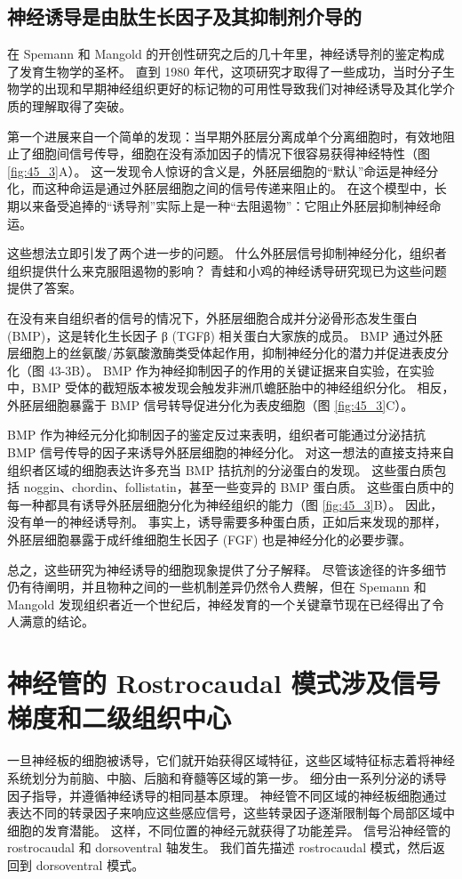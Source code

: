 \subsection{神经诱导是由肽生长因子及其抑制剂介导的}

在 Spemann 和 Mangold 的开创性研究之后的几十年里，神经诱导剂的鉴定构成了发育生物学的圣杯。 直到 1980 年代，这项研究才取得了一些成功，当时分子生物学的出现和早期神经组织更好的标记物的可用性导致我们对神经诱导及其化学介质的理解取得了突破。

第一个进展来自一个简单的发现：当早期外胚层分离成单个分离细胞时，有效地阻止了细胞间信号传导，细胞在没有添加因子的情况下很容易获得神经特性（图 \ref{fig:45_3}A）。 这一发现令人惊讶的含义是，外胚层细胞的“默认”命运是神经分化，而这种命运是通过外胚层细胞之间的信号传递来阻止的。 在这个模型中，长期以来备受追捧的“诱导剂”实际上是一种“去阻遏物”：它阻止外胚层抑制神经命运。

这些想法立即引发了两个进一步的问题。 什么外胚层信号抑制神经分化，组织者组织提供什么来克服阻遏物的影响？ 青蛙和小鸡的神经诱导研究现已为这些问题提供了答案。

在没有来自组织者的信号的情况下，外胚层细胞合成并分泌骨形态发生蛋白 (BMP)，这是转化生长因子 β (TGFβ) 相关蛋白大家族的成员。 BMP 通过外胚层细胞上的丝氨酸/苏氨酸激酶类受体起作用，抑制神经分化的潜力并促进表皮分化（图 43-3B）。 BMP 作为神经抑制因子的作用的关键证据来自实验，在实验中，BMP 受体的截短版本被发现会触发非洲爪蟾胚胎中的神经组织分化。 相反，外胚层细胞暴露于 BMP 信号转导促进分化为表皮细胞（图 \ref{fig:45_3}C）。

BMP 作为神经元分化抑制因子的鉴定反过来表明，组织者可能通过分泌拮抗 BMP 信号传导的因子来诱导外胚层细胞的神经分化。 对这一想法的直接支持来自组织者区域的细胞表达许多充当 BMP 拮抗剂的分泌蛋白的发现。 这些蛋白质包括 noggin、chordin、follistatin，甚至一些变异的 BMP 蛋白质。 这些蛋白质中的每一种都具有诱导外胚层细胞分化为神经组织的能力（图 \ref{fig:45_3}B）。 因此，没有单一的神经诱导剂。 事实上，诱导需要多种蛋白质，正如后来发现的那样，外胚层细胞暴露于成纤维细胞生长因子 (FGF) 也是神经分化的必要步骤。

总之，这些研究为神经诱导的细胞现象提供了分子解释。 尽管该途径的许多细节仍有待阐明，并且物种之间的一些机制差异仍然令人费解，但在 Spemann 和 Mangold 发现组织者近一个世纪后，神经发育的一个关键章节现在已经得出了令人满意的结论。

\section{神经管的 Rostrocaudal 模式涉及信号梯度和二级组织中心}
一旦神经板的细胞被诱导，它们就开始获得区域特征，这些区域特征标志着将神经系统划分为前脑、中脑、后脑和脊髓等区域的第一步。 细分由一系列分泌的诱导因子指导，并遵循神经诱导的相同基本原理。 神经管不同区域的神经板细胞通过表达不同的转录因子来响应这些感应信号，这些转录因子逐渐限制每个局部区域中细胞的发育潜能。 这样，不同位置的神经元就获得了功能差异。 信号沿神经管的 rostrocaudal 和 dorsoventral 轴发生。 我们首先描述 rostrocaudal 模式，然后返回到 dorsoventral 模式。

